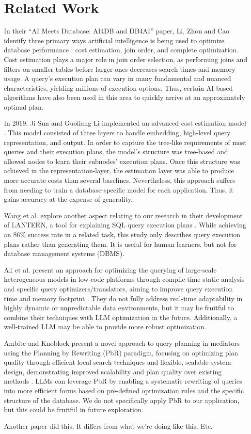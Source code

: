 \section{Related Work}
In their ``AI Meets Database: AI4DB and DB4AI'' paper, Li, Zhou and Cao identify three primary ways artificial intelligence is being used to optimize database performance \cite{li2021}: cost estimation, join order, and complete optimization. Cost estimation plays a major role in join order selection, as performing joins and filters on smaller tables before larger ones decreases search times and memory usage. A query's execution plan can vary in many fundamental and nuanced characteristics, yielding millions of execution options. Thus, certain AI-based algorithms have also been used in this area to quickly arrive at an approximately optimal plan.

In 2019, Ji Sun and Guoliang Li implemented an advanced cost estimation model \cite{sun2019}. This model consisted of three layers to handle embedding, high-level query representation, and output. In order to capture the tree-like requirements of most queries and their execution plans, the model's structure was tree-based and allowed nodes to learn their subnodes' execution plans. Once this structure was achieved in the representation-layer, the estimation layer was able to produce more accurate costs than several baselines. Nevertheless, this approach suffers from needing to train a database-specific model for each application. Thus, it gains accuracy at the expense of generality.

Wang et al. explore another aspect relating to our research in their development of LANTERN, a tool for explaining SQL query execution plans \cite{wang2021}. While achieving an 86\% success rate in a related task, this study only describes query execution plans rather than generating them. It is useful for human learners, but not for database management systems (DBMS).

Ali et al. present an approach for optimizing the querying of large-scale heterogeneous models in low-code platforms through compile-time static analysis and specific query optimizers/translators, aiming to improve query execution time and memory footprint \cite{Ali2020EfficientlyQM}. They do not fully address real-time adaptability in highly dynamic or unpredictable data environments, but it may be fruitful to combine their techniques with LLM optimization in the future. Additionally, a well-trained LLM may be able to provide more robust optimization.

Ambite and Knoblock present a novel approach to query planning in mediators using the Planning by Rewriting (PbR) paradigm, focusing on optimizing plan quality through efficient local search techniques and flexible, scalable system design, demonstrating improved scalability and plan quality over existing methods \cite{Ambite2000FlexibleQP}. LLMs can leverage PbR by enabling a systematic rewriting of queries into more efficient forms based on pre-defined optimization rules and the specific structure of the database. We do not specifically apply PbR to our application, but this could be fruitful in future exploration.

Another paper did this. It differs from what we're doing like this. Etc.
